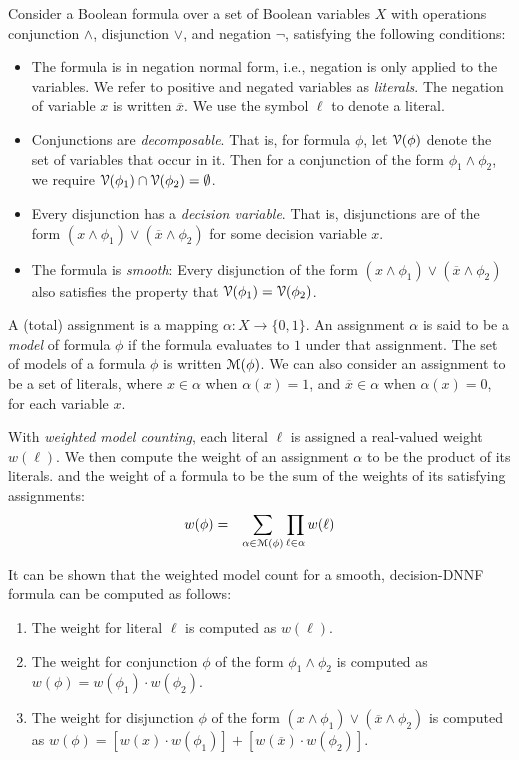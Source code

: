 \documentclass[letterpaper,USenglish,cleveref, autoref, thm-restate]{lipics-v2021}
\newcommand{\obar}[1]{\overline{#1}}
\newcommand{\lit}{\ell}
\newcommand{\varset}{X}
\newcommand{\dependencyset}{{\cal V}}
\newcommand{\assign}{\alpha}
\newcommand{\modelset}{{\cal M}}
\begin{document}
Consider a Boolean formula over a set of Boolean variables $\varset$
with operations conjunction $\land$, disjunction $\lor$, and negation
$\neg$, satisfying the following conditions:
\begin{itemize}
\item The formula is in negation normal form, i.e., negation is only
  applied to the variables.  We refer to positive and negated
  variables as \emph{literals}.  The negation of variable $x$ is
  written $\obar{x}$. We use the symbol $\lit$ to denote a literal.
\item Conjunctions are \emph{decomposable}.  That is, for formula $\phi$, let $\dependencyset(\phi)$ denote the set of variables that occur in it.  Then for a conjunction of the form
  $\phi_1 \land \phi_2$, we require $\dependencyset(\phi_1) \cap \dependencyset(\phi_2) = \emptyset$.
\item Every disjunction has a \emph{decision variable}.  That is, disjunctions are of the form $(x \land \phi_1) \lor (\obar{x} \land \phi_2)$ for some decision variable $x$. 
\item The formula is \emph{smooth}: Every disjunction of the form $(x \land \phi_1) \lor (\obar{x} \land \phi_2)$ 
also satisfies the property that $\dependencyset(\phi_1) = \dependencyset(\phi_2)$.
\end{itemize}

A (total) assignment is a mapping $\assign \colon \varset \rightarrow \{0, 1\}$.  An assignment $\assign$ is said to be a \emph{model} of formula
$\phi$ if the formula evaluates to $1$ under that assignment.  The
set of models of a formula $\phi$ is written $\modelset(\phi)$.  We
can also consider an assignment to be a set of literals, where
$x \in \assign$ when $\assign(x) = 1$, and  $\obar{x} \in \assign$ when $\assign(x) = 0$, for each variable $x$.

With \emph{weighted model counting}, each literal $\lit$ is assigned a
real-valued weight $w(\lit)$.  We then compute the weight of an
assignment $\assign$ to be the product of its literals. and the weight
of a formula to be the sum of the weights of its satisfying assignments:
\begin{eqnarray}
  w(\phi) & = & \sum_{\assign \in \modelset(\phi)} \prod_{\lit \in \assign} w(\lit) \label{eqn:model:count}
\end{eqnarray}

It can be shown that the weighted model count for a smooth, decision-DNNF formula can be computed as follows:
\begin{enumerate}
\item The weight for literal $\lit$ is computed as $w(\lit)$.
\item The weight for  conjunction $\phi$ of the form $\phi_1 \land \phi_2$ is computed as $w(\phi) = w(\phi_1) \cdot w(\phi_2)$.
\item The weight for disjunction $\phi$ of the form 
  $(x \land \phi_1) \lor (\obar{x} \land \phi_2)$ is computed as
  $w(\phi) = [w(x) \cdot w(\phi_1)] + [w(\obar{x}) \cdot w(\phi_2)]$.
\end{enumerate}
\end{document}
